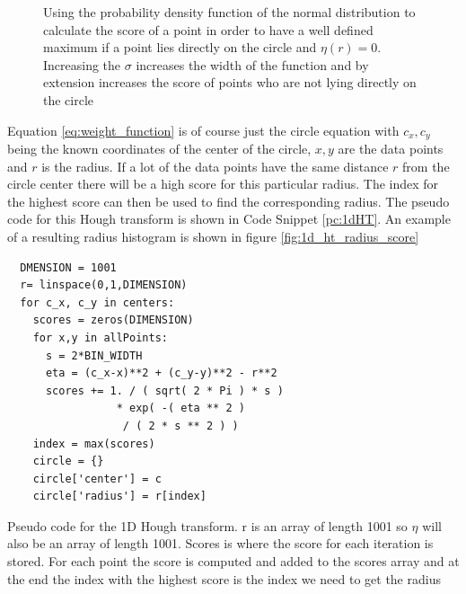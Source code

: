 \documentclass[11pt]{scrreprt}
\begin{document}
\begin{figure}[ht]
\centering
    \caption[Normal Distribution: Used as a weight function]{Using the probability density function of the normal distribution to 
    calculate the score of a point in order to have a well defined maximum if a point lies directly on the circle and $\eta(r) = 0$. 
    Increasing the $\sigma$ increases the width of the function and by extension increases the score of points who are not lying 
    directly on the circle}
  \label{fig:gauss}
\end{figure}
Equation \ref{eq:weight_function} is of course just the circle equation with $c_x, c_y$ being the known coordinates of the center of 
the circle, $x, y$ are the data points and $r$ is the radius. If a lot of the data points have the same distance $r$ from the circle 
center there will be a high score for this particular radius. The index for the highest score can then be used to find the 
corresponding radius. The pseudo code for this Hough transform is shown in Code Snippet \ref{pc:1dHT}. An example of a resulting radius
histogram is shown in figure \ref{fig:1d_ht_radius_score}

\begin{codesnippet}[htb]
  \begin{lstlisting}
  DMENSION = 1001
  r= linspace(0,1,DIMENSION)
  for c_x, c_y in centers:
    scores = zeros(DIMENSION)
    for x,y in allPoints:
      s = 2*BIN_WIDTH
      eta = (c_x-x)**2 + (c_y-y)**2 - r**2
      scores += 1. / ( sqrt( 2 * Pi ) * s ) 
                 * exp( -( eta ** 2 ) 
                  / ( 2 * s ** 2 ) )
    index = max(scores)
    circle = {}
    circle['center'] = c
    circle['radius'] = r[index]
\end{lstlisting}
\caption[Pseudo Code 1D HT]{Pseudo code for the 1D Hough transform. r is an array of length 1001 so $\eta$ will also be an 
array of length 1001. Scores is where the score for each iteration is stored. For each point the score is computed and added 
to the scores array and at the end the index with the highest score is the index we need to get the radius}\label{pc:1dHT}
\end{codesnippet}
\end{document}
